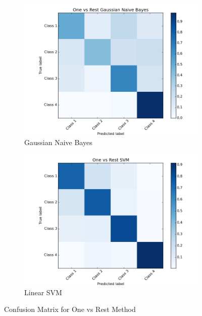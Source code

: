 \documentclass[11pt]{article}
\begin{document}
\begin{figure}[H]
	
	\begin{subfigure}[b]{0.5\textwidth}
		\includegraphics[width=\textwidth]{ovr_gnb.png}
		\caption{Gaussian Naive Bayes}
	\end{subfigure}
	\begin{subfigure}[b]{0.5\textwidth}
		\includegraphics[width=\textwidth]{ovr_svm.png}
		\caption{Linear SVM}
	\end{subfigure}
	\caption{Confusion Matrix for One vs Rest Method}
	\label{fig:cm_ovr}
\end{figure}
\end{document}
